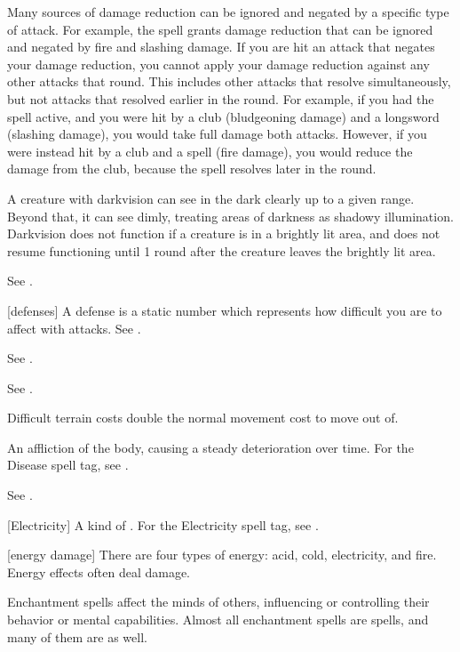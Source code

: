 Many sources of damage reduction can be ignored and negated by a specific type of attack.
For example, the  spell grants damage reduction that can be ignored and negated by fire and slashing damage.
If you are hit an attack that negates your damage reduction, you cannot apply your damage reduction against any other attacks that round.
This includes other attacks that resolve simultaneously, but not attacks that resolved earlier in the round.
For example, if you had the  spell active, and you were hit by a club (bludgeoning damage) and a longsword (slashing damage), you would take full damage both attacks.
However, if you were instead hit by a club and a  spell (fire damage), you would reduce the damage from the club, because the spell resolves later in the round.

 A creature with darkvision can see in the dark clearly up to a given range.
Beyond that, it can see dimly, treating areas of darkness as shadowy illumination.
Darkvision does not function if a creature is in a brightly lit area, and does not resume functioning until 1 round after the creature leaves the brightly lit area.

 See .

[defenses] A defense is a static number which represents how difficult you are to affect with attacks. See .

 See .

 See .

 Difficult terrain costs double the normal movement cost to move out of.

 An affliction of the body, causing a steady deterioration over time. For the Disease spell tag, see .

 See .

[Electricity] A kind of . For the Electricity spell tag, see .

[energy damage] There are four types of energy: acid, cold, electricity, and fire. Energy effects often deal damage.

 Enchantment spells affect the minds of others, influencing or controlling their behavior or mental capabilities. Almost all enchantment spells are  spells, and many of them are  as well.

